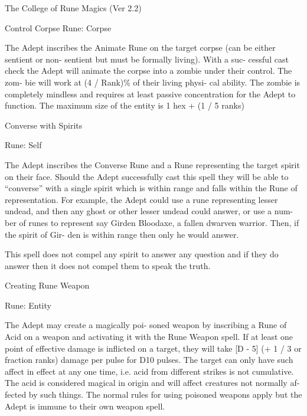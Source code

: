 \begin{Chapter}{The College of Rune Magics (Ver 2.2)}
\begin{spell}[S-2]{Control Corpse }
Rune: Corpse 
\begin{effects}
The Adept inscribes the Animate Rune on 
the  target  corpse  (can  be  either  sentient  or  non-
sentient  but  must  be  formally  living).  With  a  suc-
cessful  cast  check  the  Adept  will  animate  the 
corpse into a zombie under their control. The zom-
bie will work at (4 / Rank)\% of their living physi-
cal ability. The zombie is completely mindless and 
requires  at  least  passive  concentration  for  the 
Adept to function. The maximum size of the entity 
is 1 hex + (1 / 5 ranks) 

\end{effects}
\end{spell}

\begin{spell}[S-3]{Converse with Spirits }

Rune: Self 
\begin{effects}
 The  Adept  inscribes  the  Converse  Rune 
and  a  Rune  representing  the  target  spirit  on  their 
face.  Should  the  Adept  successfully  cast  this  spell 
they will be able to “converse” with a single spirit 
which is within range and falls within the Rune of 
representation. For example, the Adept could use a 
rune representing lesser undead, and then any ghost 
or other lesser undead could answer, or use a num-
ber  of  runes  to  represent  say  Girden  Bloodaxe,  a 
fallen  dwarven  warrior.  Then,  if  the  spirit  of  Gir-
den is within range then only he would answer. 

This spell does not compel any spirit to answer any 
question  and  if  they  do  answer  then  it  does  not 
compel them to speak the truth. 

\end{effects}
\end{spell}

\begin{spell}[S-4]{Creating Rune Weapon }

Rune: Entity 
\begin{effects}
 The  Adept  may  create  a  magically  poi-
soned  weapon  by  inscribing  a  Rune  of  Acid  on  a 
weapon  and  activating  it  with  the  Rune  Weapon 
spell.  If  at  least  one  point  of  effective  damage  is 
inflicted on a target, they will take [D - 5] (+ 1 / 3 
or fraction ranks) damage per pulse for D10 pulses. 
The  target  can  only  have  such  affect  in  effect  at 
any one time, i.e. acid from different strikes is not 
cumulative.  The  acid  is  considered  magical  in 
origin  and  will  affect  creatures  not  normally  af-
fected  by  such  things.  The  normal  rules  for  using 
poisoned  weapons  apply  but  the  Adept  is  immune 
to their own weapon spell. 


\end{effects}
\end{spell}
\end{Chapter}
